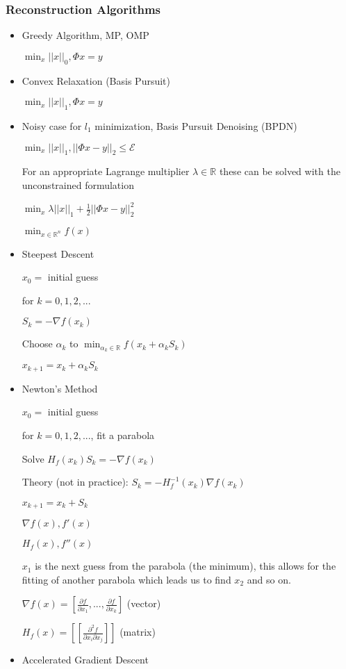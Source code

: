 \documentclass[12pt,letterpaper]{report}
\begin{document}
\subsubsection*{Reconstruction Algorithms}

\begin{itemize}
\item
Greedy Algorithm, MP, OMP

$\min_x ||x||_0, \Phi x = y$

\item
Convex Relaxation (Basis Pursuit)

$\min_x ||x||_1, \Phi x = y$

\item
Noisy case for $l_1$ minimization, Basis Pursuit Denoising (BPDN)

$\min_x ||x||_1, ||\Phi x - y||_2 \leq \mathcal{E}$

For an appropriate Lagrange multiplier $\lambda \in \mathbb{R}$ these can be solved with the unconstrained formulation

$\min_x \lambda ||x||_1 + \frac{1}{2} ||\Phi x - y||_2^2$

$\min_{x \in \mathbb{R}^n} f(x)$

\item
Steepest Descent

$x_0 =$ initial guess

for $k = 0, 1, 2, ...$

$S_k = -\nabla f(x_k)$

Choose $\alpha_k$ to $\min_{\alpha_k \in \mathbb{R}} f(x_k + \alpha_k S_k)$

$x_{k+1} = x_k + \alpha_k S_k$

\item
Newton's Method

$x_0 =$ initial guess

for $k = 0, 1, 2, ...$, fit a parabola

Solve $H_f(x_k)S_k = -\nabla f(x_k)$

Theory (not in practice): $S_k = -H_f^{-1}(x_k) \nabla f(x_k)$

$x_{k+1} = x_k + S_k$


$\nabla f(x), f'(x)$

$H_f(x), f''(x)$

$x_1$ is the next guess from the parabola (the minimum), this allows for the fitting of another parabola which leads us to find $x_2$ and so on.

$\nabla f(x) = [\frac{\partial f}{\partial x_1}, ..., \frac{\partial f}{\partial x_k}]$ (vector)

$H_f(x) = [[\frac{\partial^2 f}{\partial x_i \partial x_j}]]$ (matrix)

\item
Accelerated Gradient Descent

\end{itemize}
\end{document}
